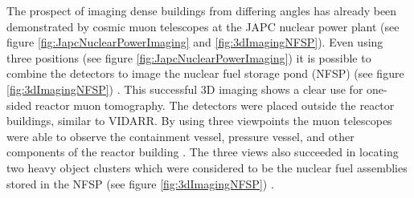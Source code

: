 The prospect of imaging dense buildings from differing angles has already been demonstrated by cosmic muon telescopes at the JAPC nuclear power plant (see figure \ref{fig:JapcNuclearPowerImaging} and \ref{fig:3dImagingNFSP}). Even using three positions (see figure \ref{fig:JapcNuclearPowerImaging}) it is possible to combine the detectors to image the nuclear fuel storage pond (NFSP) (see figure \ref{fig:3dImagingNFSP}) \cite{Fujii_ReactorRadiography_2019}. This successful 3D imaging shows a clear use for one-sided reactor muon tomography. The detectors were placed outside the reactor buildings, similar to VIDARR. By using three viewpoints the muon telescopes were able to observe the containment vessel, pressure vessel, and other components of the reactor building \cite{Fujii_ReactorRadiography_2019}. The three views also succeeded in locating two heavy object clusters which were considered to be the nuclear fuel assemblies stored in the NFSP (see figure \ref{fig:3dImagingNFSP}) \cite{Fujii_ReactorRadiography_2019}.

